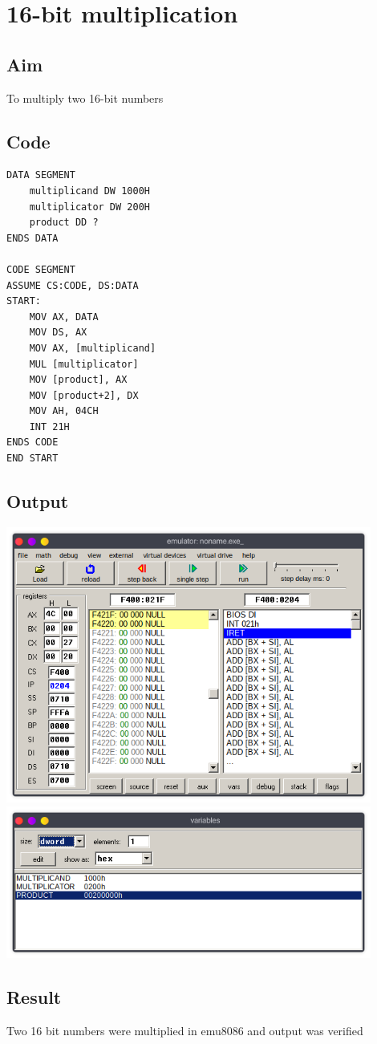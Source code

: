 \section{16-bit multiplication}
\subsection{Aim}
To multiply two 16-bit numbers

\subsection{Code}
\begin{lstlisting}
DATA SEGMENT
	multiplicand DW 1000H
	multiplicator DW 200H
	product DD ?
ENDS DATA 

CODE SEGMENT
ASSUME CS:CODE, DS:DATA
START:
	MOV AX, DATA
	MOV DS, AX
	MOV AX, [multiplicand]
	MUL [multiplicator]
	MOV [product], AX
	MOV [product+2], DX
    MOV AH, 04CH
    INT 21H
ENDS CODE
END START
\end{lstlisting}

\subsection{Output}
\begin{center}
	\includegraphics[width=0.90\textwidth]{img/p5/ss1.png}
	\includegraphics[width=0.90\textwidth]{img/p5/ss2.png}
\end{center}

\subsection{Result}
Two 16 bit numbers were multiplied in emu8086 and output was verified